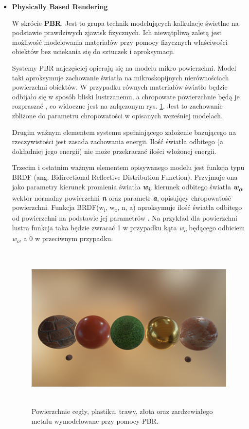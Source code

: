 \begin{itemize}
	\item \textbf{Physically Based Rendering}
	
	W skrócie \textbf{PBR}. Jest to grupa technik modelujących kalkulacje świetlne na podstawie prawdziwych zjawisk fizycznych. Ich niewątpliwą zaletą jest możliwość modelowania materiałów przy pomocy fizycznych właściwości obiektów bez uciekania się do sztuczek i aproksymacji.
	
	Systemy PBR najczęściej opierają się na modelu mikro powierzchni. Model taki aproksymuje zachowanie światła na mikroskopijnych nierównościach powierzchni obiektów. W przypadku równych materiałów światło będzie odbijało się w sposób bliski lustrzanemu, a chropowate powierzchnie będą je rozpraszać \cite{learnopengl:pbr:2024}, co widoczne jest na załączonym rys. \ref{intro-PBR}. Jest to zachowanie zbliżone do parametru chropowatości w opisanych wcześniej modelach.

	Drugim ważnym elementem systemu spełniającego założenie bazującego na rzeczywistości jest zasada zachowania energii. Ilość światła odbitego (a dokładniej jego energii) nie może przekraczać ilości włożonej energii. \cite{learnopengl:pbr:2024}

	Trzecim i ostatnim ważnym elementem opisywanego modelu jest funkcja typu BRDF (ang. Bidirectional Reflective Distribution Function). Przyjmuje ona jako parametry kierunek promienia światła \emph{\textbf{w\textsubscript{i}},} kierunek odbitego światła \emph{\textbf{w\textsubscript{o}}}, wektor normalny powierzchni \emph{\textbf{n}} oraz parametr \emph{\textbf{a}}, opisujący chropowatość powierzchni. Funkcja BRDF(w\textsubscript{i}, w\textsubscript{o}, n, a) aproksymuje ilość światła odbitego od powierzchni na podstawie jej parametrów \cite{learnopengl:pbr:2024}. Na przykład dla powierzchni lustra funkcja taka będzie zwracać 1 w przypadku kąta \emph{w\textsubscript{o}} będącego odbiciem \emph{w\textsubscript{o}}, a 0 w przeciwnym przypadku.
	
	\begin{figure}[htbp]
		\centering
		\includegraphics[width=5.425in,height=3.2752in]{images/8_pbr_surfaces.png}
		\caption{Powierzchnie cegły, plastiku, trawy, złota oraz zardzewiałego metalu wymodelowane przy pomocy PBR. \cite{learnopengl:pbr:2024}}
		\label{intro-PBR}
	\end{figure}
\end{itemize}

